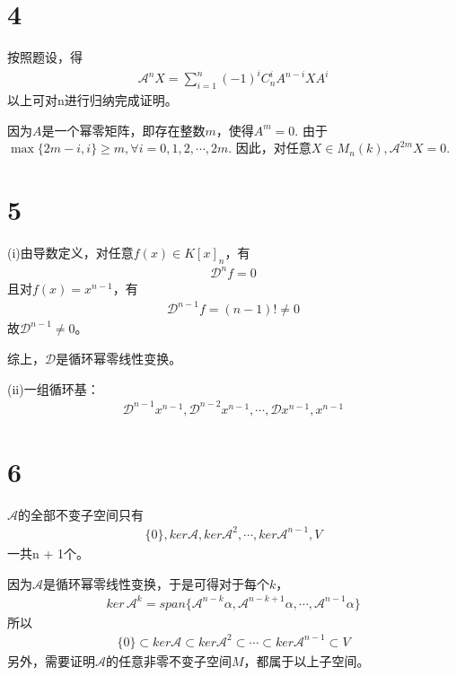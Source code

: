 \documentclass{article}
\begin{document}
\section*{4}

按照题设，得
\begin{align*}
  \mathscr{A}^n X = \sum \limits_{i = 1}^n (-1)^i C_n^i A^{n - i} X A^i
\end{align*}
以上可对n进行归纳完成证明。

因为$A$是一个幂零矩阵，即存在整数$m$，使得$A^m = 0$.
由于$\max\{2m - i, i\} \geq m, \forall i = 0, 1, 2, \cdots, 2m$.
因此，对任意$X \in M_n(k), \mathscr{A}^{2m} X = 0$.

\section*{5}

 (i)由导数定义，对任意$f(x) \in K[x]_n$，有
\begin{align*}
  \mathscr{D}^n f = 0
\end{align*}
且对$f(x) = x^{n - 1}$，有
\begin{align*}
  \mathscr{D}^{n - 1} f = (n - 1)! \neq 0
\end{align*}
故$\mathscr{D}^{n - 1} \neq 0$。

综上，$\mathscr{D}$是循环幂零线性变换。

(ii)一组循环基：
\begin{align*}
  \mathscr{D}^{n - 1} x^{n - 1},
  \mathscr{D}^{n - 2} x^{n - 1},
  \cdots,
  \mathscr{D} x^{n - 1},
  x^{n - 1}
\end{align*}

\section*{6}

$\mathscr{A}$的全部不变子空间只有
\begin{align*}
  \{0\}, ker \mathscr{A}, ker \mathscr{A}^2, \cdots, ker \mathscr{A}^{n - 1}, V
\end{align*}
一共n + 1个。

因为$\mathscr{A}$是循环幂零线性变换，于是可得对于每个$k$，
\begin{align*}
  ker\, \mathscr{A}^k = span \{\mathscr{A}^{n - k} \alpha, \mathscr{A}^{n - k + 1} \alpha, \cdots, \mathscr{A}^{n - 1} \alpha\}
\end{align*}
所以
\begin{align*}
  \{0\} \subset ker \mathscr{A} \subset ker \mathscr{A}^{2} \subset \cdots \subset ker \mathscr{A}^{n - 1} \subset V
\end{align*}
另外，需要证明$\mathscr{A}$的任意非零不变子空间$M$，都属于以上子空间。
\end{document}
